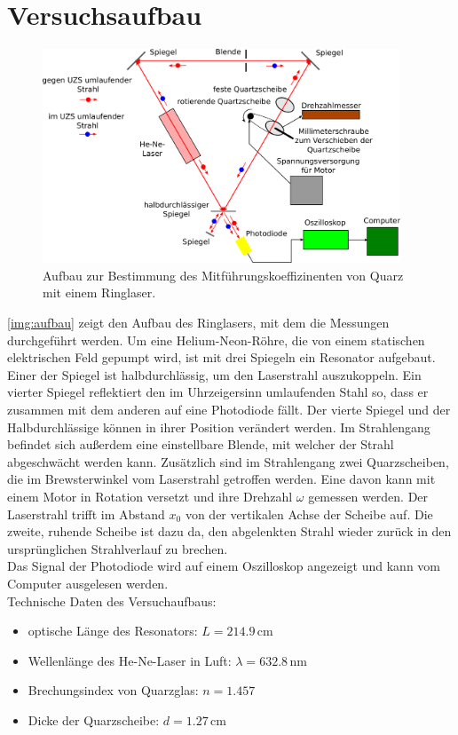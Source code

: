 \section{Versuchsaufbau}
\label{sec:aufbau}

\begin{figure}[H]
\begin{center}
  \includegraphics[width=0.95\textwidth]{../img/aufbau.pdf}
  \caption{Aufbau zur Bestimmung des Mitführungskoeffizinenten von Quarz mit einem Ringlaser.}
  \label{img:aufbau}
\end{center}
\end{figure}
\autoref{img:aufbau} zeigt den Aufbau des Ringlasers,
mit dem die Messungen durchgeführt werden.
Um eine Helium-Neon-Röhre,
die von einem statischen elektrischen Feld gepumpt wird,
ist mit drei Spiegeln ein Resonator aufgebaut.
Einer der Spiegel ist halbdurchlässig, um den Laserstrahl auszukoppeln.
Ein vierter Spiegel reflektiert den im Uhrzeigersinn umlaufenden Stahl so,
dass er zusammen mit dem anderen auf eine Photodiode fällt.
Der vierte Spiegel und der Halbdurchlässige können in ihrer Position verändert werden.
Im Strahlengang befindet sich außerdem eine einstellbare Blende,
mit welcher der Strahl abgeschwächt werden kann.
Zusätzlich sind im Strahlengang zwei Quarzscheiben,
die im Brewsterwinkel vom Laserstrahl getroffen werden.
Eine davon kann mit einem Motor in Rotation versetzt und ihre Drehzahl $\omega$ gemessen werden.
Der Laserstrahl trifft im Abstand $x_0$ von der vertikalen Achse der Scheibe auf.
Die zweite, ruhende Scheibe ist dazu da,
den abgelenkten Strahl wieder zurück in den ursprünglichen Strahlverlauf zu brechen.\\
Das Signal der Photodiode wird auf einem Oszilloskop angezeigt und kann
vom Computer ausgelesen werden. \\[\baselineskip]
Technische Daten des Versuchaufbaus:
\begin{itemize}
  \item optische Länge des Resonators: $L = 214.9$\,cm
  \item Wellenlänge des He-Ne-Laser in Luft: $\lambda = 632.8$\,nm
  \item Brechungsindex von Quarzglas: $n = 1.457$
  \item Dicke der Quarzscheibe: $d = 1.27$\,cm
\end{itemize}